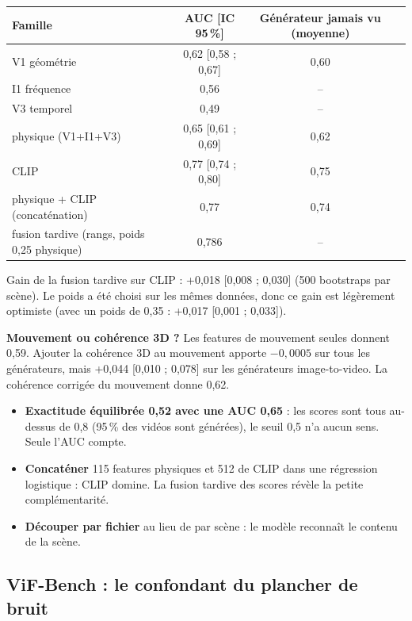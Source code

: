 \documentclass[11pt,a4paper]{article}
\begin{document}
\begin{resultat}
\begin{center}\small
\begin{tabular}{lccc}
\toprule
Famille & AUC [IC 95\,\%] & Générateur jamais vu (moyenne) \\
\midrule
V1 géométrie & 0,62 [0,58 ; 0,67] & 0,60 \\
I1 fréquence & 0,56 & -- \\
V3 temporel & 0,49 & -- \\
physique (V1+I1+V3) & 0,65 [0,61 ; 0,69] & 0,62 \\
CLIP & 0,77 [0,74 ; 0,80] & 0,75 \\
physique + CLIP (concaténation) & 0,77 & 0,74 \\
fusion tardive (rangs, poids 0,25 physique) & 0,786 & -- \\
\bottomrule
\end{tabular}
\end{center}
Gain de la fusion tardive sur CLIP : +0,018 [0,008 ; 0,030] (500 bootstraps par scène). Le poids a été
choisi sur les mêmes données, donc ce gain est légèrement optimiste (avec un poids de 0,35 :
+0,017 [0,001 ; 0,033]).

\textbf{Mouvement ou cohérence 3D ?} Les features de mouvement seules donnent 0,59. Ajouter la
cohérence 3D au mouvement apporte $-0{,}0005$ sur tous les générateurs, mais +0,044 [0,010 ; 0,078] sur
les générateurs image-to-video. La cohérence corrigée du mouvement donne 0,62.
\end{resultat}

\begin{piege}
\begin{itemize}
  \item \textbf{Exactitude équilibrée 0,52 avec une AUC 0,65} : les scores sont tous au-dessus de 0,8
        (95\,\% des vidéos sont générées), le seuil 0,5 n'a aucun sens. Seule l'AUC compte.
  \item \textbf{Concaténer} 115 features physiques et 512 de CLIP dans une régression logistique :
        CLIP domine. La fusion tardive des scores révèle la petite complémentarité.
  \item \textbf{Découper par fichier} au lieu de par scène : le modèle reconnaît le contenu de la scène.
\end{itemize}
\end{piege}

\subsection{ViF-Bench : le confondant du plancher de bruit}\label{sec:vif}
\end{document}
